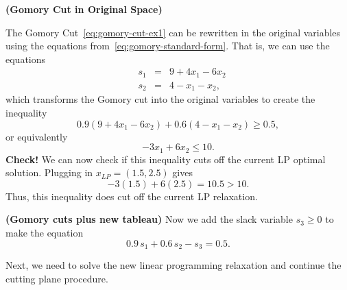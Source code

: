 \begin{example}{\textbf{(Gomory Cut in Original Space)}}{}

The Gomory Cut~\eqref{eq:gomory-cut-ex1} can be rewritten in the original variables using the equations from~\eqref{eq:gomory-standard-form}.  That is, we can use the equations
\begin{equation}
\label{eq:gomory-standard-form-equations}
\begin{array}{lrcl}
 & s_1 & = & 9 + 4x_1 - 6x_2\\
&s_2  & = & 4 - x_1 - x_2,
\end{array}
\end{equation}
which transforms the Gomory cut into the original variables to create the inequality
\begin{equation*}
0.9 (9 + 4x_1 - 6x_2) + 0.6(4 - x_1 - x_2) \geq 0.5,
\end{equation*}
or equivalently
\begin{equation}
\label{eq:gomory-cut-ex1-original}
- 3 x_1 + 6 x_2 \leq 10.
\end{equation}
\textbf{Check!} We can now check if this inequality cuts off the current LP optimal solution. Plugging in $x_{LP} = (1.5, 2.5)$ gives
\begin{equation*}
- 3 (1.5) + 6 (2.5) = 10.5 > 10.
\end{equation*}
Thus, this inequality does cut off the current LP relaxation.

\end{example}

\begin{example}{\textbf{(Gomory  cuts plus new tableau)}}{}
Now we add the slack variable $s_3 \geq 0$ to make the equation
\begin{equation}
0.9\, s_1 + 0.6\, s_2 - s_3 = 0.5.
\end{equation}

\end{example}

Next, we need to solve the new linear programming relaxation and continue the cutting plane procedure.

